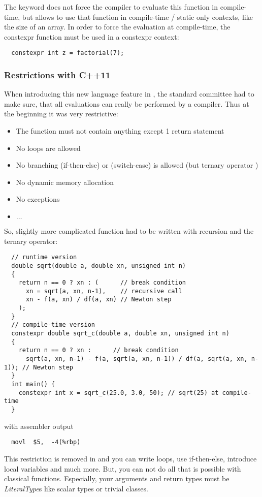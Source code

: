 The keyword  does not force the compiler to evaluate this function in compile-time, but allows to use that function in
compile-time / static only contexts, like the size of an array. In order to force the evaluation at compile-time, the constexpr function
must be used in a constexpr context:
\begin{verbatim}
  constexpr int z = factorial(7);
\end{verbatim}


\subsubsection{Restrictions with C++11}
When introducing this new language feature in , the standard committee had to make sure, that all evaluations can really be performed
by a compiler. Thus at the beginning it was very restrictive:
\begin{itemize}
  \item The function must not contain anything except 1 return statement
  \item No loops are allowed
  \item No branching (if-then-else) or (switch-case) is allowed (but ternary operator )
  \item No dynamic memory allocation
  \item No exceptions
  \item $\ldots$
\end{itemize}

So, slightly more complicated function had to be written with recursion and the ternary operator:
%
\begin{verbatim}
  // runtime version
  double sqrt(double a, double xn, unsigned int n)
  {
    return n == 0 ? xn : (      // break condition
      xn = sqrt(a, xn, n-1),    // recursive call
      xn - f(a, xn) / df(a, xn) // Newton step
    );
  }
  // compile-time version
  constexpr double sqrt_c(double a, double xn, unsigned int n)
  {
    return n == 0 ? xn :      // break condition
      sqrt(a, xn, n-1) - f(a, sqrt(a, xn, n-1)) / df(a, sqrt(a, xn, n-1)); // Newton step
  }
  int main() {
    constexpr int x = sqrt_c(25.0, 3.0, 50); // sqrt(25) at compile-time
  }
\end{verbatim}
%
with assembler output
\begin{verbatim}
  movl  $5,  -4(%rbp)
\end{verbatim}

This restriction is removed in  and you can write loops, use if-then-else, introduce local variables and much more. But, you can not do
all that is possible with classical functions. Especially, your arguments and return types must be \emph{LiteralType}s like scalar types or
trivial classes.


